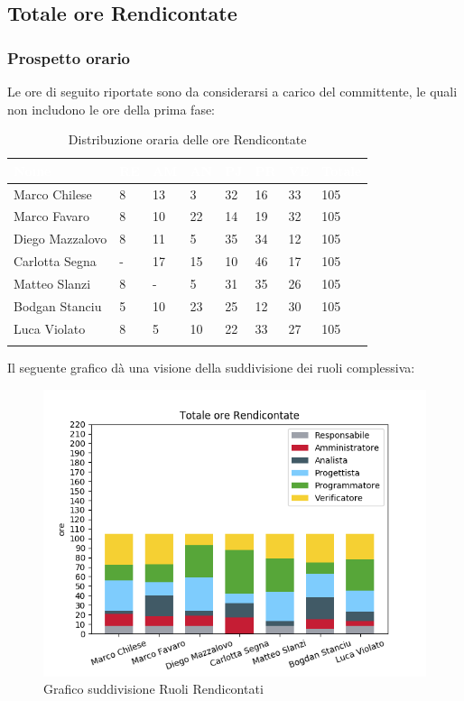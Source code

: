 \newpage
\subsection{Totale ore Rendicontate}
\label{PTRR}
\subsubsection{Prospetto orario}

Le ore di seguito riportate sono da considerarsi a carico del committente, le quali non includono le ore della prima fase:

\begin{longtable}{|C{.30\textwidth}|C{.06\textwidth}|C{.06\textwidth}|C{.06\textwidth} | C{.06\textwidth}| C{.06\textwidth} | C{.06\textwidth} | C{.10\textwidth} |}
\hline
{}	\textbf{\textcolor{white}{Nome}} & \textbf{\textcolor{white}{RE}} & \textbf{\textcolor{white}{AM}} & \textbf{\textcolor{white}{AN}} & \textbf{\textcolor{white}{PJ}} & \textbf{\textcolor{white}{PR}} & \textbf{\textcolor{white}{VE}} & \textbf{\textcolor{white}{Totale}}\\
\hline 
Marco Chilese & 8 & 13 & 3 & 32 & 16 & 33 & 105\\
\hline
{}Marco Favaro & 8 & 10 & 22 & 14 & 19 & 32 & 105\\
\hline
Diego Mazzalovo & 8 & 11 & 5 & 35 & 34 & 12 & 105\\
\hline
{}Carlotta Segna & - & 17 & 15 & 10 & 46 & 17 & 105\\
\hline
Matteo Slanzi & 8 & - & 5 & 31 & 35 & 26 & 105\\
\hline
{}Bodgan Stanciu & 5 & 10 & 23 & 25 & 12 & 30 & 105\\
\hline
Luca Violato & 8 & 5 & 10 & 22 & 33 & 27 & 105 \\
\hline

\caption{Distribuzione oraria delle ore Rendicontate}
\label{Distribuzione oraria delle ore rendicontate}
\end{longtable}

Il seguente grafico dà una visione della suddivisione dei ruoli complessiva:

\begin{figure}[H]
	\centering
  		\includegraphics[width=0.8\linewidth]{./images/fig_tor.png}
  		\caption{Grafico suddivisione Ruoli Rendicontati}
  		\label{fig:grafico suddivione ruoli}
\end{figure}


